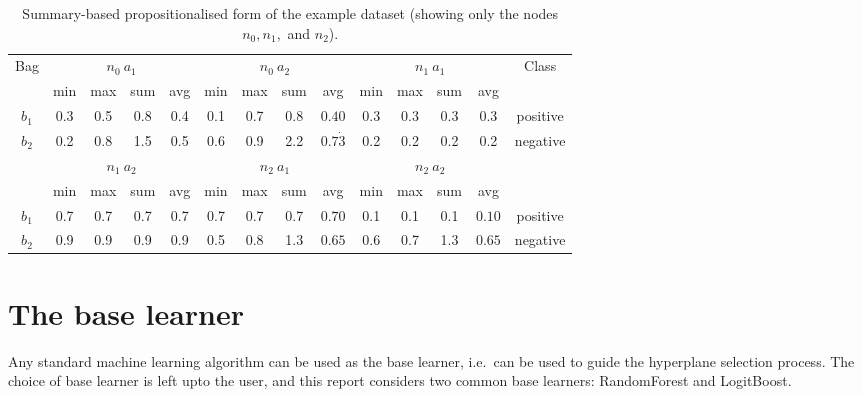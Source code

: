 \documentclass[a4paper,12pt]{report} %
\begin{document}
\begin{table}
\begin{center}
\begin{tabular}{*{14}{c}}
    \toprule
        \multirow{2}{*}{Bag} & 
        \multicolumn{4}{c}{$n_0~a_1$} & 
        \multicolumn{4}{c}{$n_0~a_2$} & 
        \multicolumn{4}{c}{$n_1~a_1$} &
        \multirow{2}{*}{Class} \\
    \cmidrule(r){2-5}
    \cmidrule(r){6-9}
    \cmidrule(r){10-13}
     & min & max & sum & avg & min & max & sum & avg & min & max & sum & avg & \\
    \midrule
    $b_1$ &  0.3 & 0.5 & 0.8 & 0.4  & 0.1 & 0.7 & 0.8 & $0.40$       & 0.3 & 0.3 & 0.3 & 0.3 & positive\\
    $b_2$ &  0.2 & 0.8 & 1.5 & 0.5  & 0.6 & 0.9 & 2.2 & $0.7\dot{3}$ & 0.2 & 0.2 & 0.2 & 0.2 & negative\\
    \bottomrule    
    \multirow{2}{*}{} & 
        \multicolumn{4}{c}{$n_1~a_2$} & 
        \multicolumn{4}{c}{$n_2~a_1$} & 
        \multicolumn{4}{c}{$n_2~a_2$} &
        \multirow{2}{*}{} \\
    \cmidrule(r){2-5}
    \cmidrule(r){6-9}
    \cmidrule(r){10-13}
     & min & max & sum & avg & min & max & sum & avg & min & max & sum & avg & \\
    \midrule
    $b_1$ &  0.7 & 0.7 & 0.7 & 0.7  & 0.7 & 0.7 & 0.7 & $0.70$  & 0.1 & 0.1 & 0.1 & $0.10$ & positive\\
    $b_2$ &  0.9 & 0.9 & 0.9 & 0.9  & 0.5 & 0.8 & 1.3 & $0.65$  & 0.6 & 0.7 & 1.3 & $0.65$ & negative\\    
    \bottomrule
    
\end{tabular}
\end{center}
\caption{Summary-based propositionalised form of the example dataset 
    (showing only the nodes $n_0, n_1,$ and $n_2$).}
\label{tEgPropAgg}
\end{table}    


\section{The base learner} 

  
Any standard machine learning algorithm can be used 
    as the base learner, i.e.\ can be used to guide the hyperplane selection process.
The choice of base learner is left upto the user, and 
    this report considers two common base learners: 
    RandomForest and LogitBoost.
\end{document}
